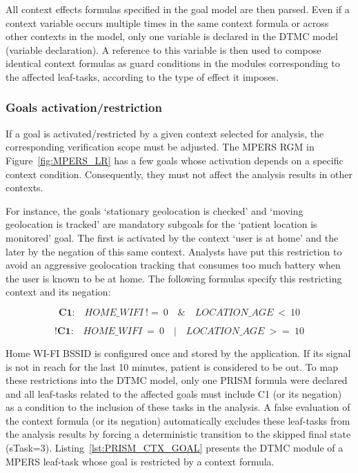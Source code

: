 All context effects formulas specified in the goal model are then parsed. Even if a context variable occurs multiple times in the same context formula or across other contexts in the model, only one variable is declared in the DTMC model (variable declaration). A reference to this variable is then used to compose identical context formulas as guard conditions in the modules corresponding to the affected leaf-tasks, according to the type of effect it imposes.



\subsubsection{Goals activation/restriction}

If a goal is activated/restricted by a given context selected for analysis, the corresponding verification scope must be adjusted. The MPERS RGM in Figure~\ref{fig:MPERS_LR} has a few goals whose activation depends on a specific context condition. Consequently, they must not affect the analysis results in other contexts.

For instance, the goals `stationary geolocation is checked' and `moving geolocation is tracked' are mandatory subgoals for the `patient location is monitored' goal. The first is activated by the context `user is at home' and the later by the negation of this same context. Analysts have put this restriction to avoid an aggressive geolocation tracking that consumes too much battery when the user is known to be at home. The following formulas specify this restricting context and its negation:

\begin{equation}\label{eq:C1a}
\textbf{C1:}\quad HOME\_WIFI\ !=\ 0\quad \&\quad LOCATION\_AGE\ <\ 10
\end{equation}

\begin{equation}\label{eq:C1b}
\textbf{!C1:}\quad HOME\_WIFI\ =\ 0\quad |\quad LOCATION\_AGE\ >=\ 10
\end{equation}

Home WI-FI BSSID is configured once and stored by the application. If its signal is not in reach for the last 10 minutes, patient is considered to be out. To map these restrictions into the DTMC model, only one PRISM formula were declared and all leaf-tasks related to the affected goals must include C1 (or its negation) as a condition to the inclusion of these tasks in the analysis. A false evaluation of the context formula (or its negation) automatically excludes these leaf-tasks from the analysis results by forcing a deterministic transition to the skipped final state (sTask=3). Listing~\ref{lst:PRISM_CTX_GOAL} presents the DTMC module of a MPERS leaf-task whose goal is restricted by a context formula.
\medskip


